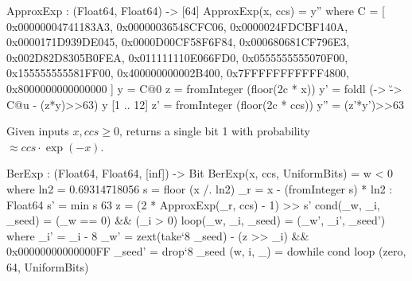 \begin{code}
  ApproxExp : (Float64, Float64) -> [64]
  ApproxExp(x, ccs) = y'' where
    C = [
            0x00000004741183A3,
            0x00000036548CFC06,
            0x0000024FDCBF140A,
            0x0000171D939DE045,
            0x0000D00CF58F6F84,
            0x000680681CF796E3,
            0x002D82D8305B0FEA,
            0x011111110E066FD0,
            0x0555555555070F00,
            0x155555555581FF00,
            0x400000000002B400,
            0x7FFFFFFFFFFF4800,
            0x8000000000000000
        ]
    y = C@0
    z = fromInteger (floor(2^^63 * x))
    y' = foldl (\yy -> \u -> C@u - (z*y)>>63) y [1 .. 12]
    z' = fromInteger (floor(2^^63 * ccs))
    y'' = (z'*y')>>63
\end{code}

Given inputs $x, ccs \geq 0$, \longberexp returns a single bit 1 with probability $\approx ccs \cdot \exp(-x)$.

\begin{algorithm}[!htb]
	\caption{$\berexp(x, ccs)$}\label{alg:berexp}
	\begin{algorithmic}[1]
		 \Comment{Compute the unique decomposition $x = 2^s \cdot r$, with $(r, s) \in [0, \ln 2) \times \bZ^+$}
		\Do
		 \label{line:berexp}
		 
		 
	\end{algorithmic}
\end{algorithm}

\begin{code}
  BerExp : (Float64, Float64, [inf]) -> Bit
  BerExp(x, ccs, UniformBits) = w < 0 where
    ln2 = 0.69314718056
    s = floor (x /. ln2)
    _r = x - (fromInteger s) * ln2 : Float64
    s' = min s 63
    z = (2 * ApproxExp(_r, ccs) - 1) >> s'
    cond(_w, _i, _seed) = (_w == 0) && (_i > 0)
    loop(_w, _i, _seed) = (_w', _i', _seed') where
      _i' = _i - 8
      _w' = zext(take`{8} _seed) - (z >> _i) && 0x00000000000000FF
      _seed' = drop`{8} _seed
    (w, i, _) = dowhile cond loop (zero, 64, UniformBits)
\end{code}

